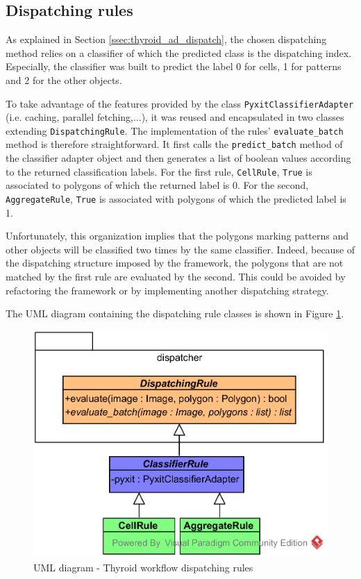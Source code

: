 \subsection{Dispatching rules}

As explained in Section \ref{ssec:thyroid_ad_dispatch}, the chosen dispatching method relies on a classifier of which the predicted class is the dispatching index. Especially, the classifier was built to predict the label 0 for cells, 1 for patterns and 2 for the other objects.

To take advantage of the features provided by the class \texttt{PyxitClassifierAdapter} (i.e. caching, parallel fetching,...), it was reused and encapsulated in two classes extending \texttt{DispatchingRule}. The implementation of the rules' \texttt{evaluate\_batch} method is therefore straightforward. It first calls the \texttt{predict\_batch} method of the classifier adapter object and then generates a list of boolean values according to the returned classification labels. For the first rule, \texttt{CellRule}, \texttt{True} is associated to polygons of which the returned label is 0. For the second, \texttt{AggregateRule}, \texttt{True} is associated with polygons of which the predicted label is 1.

Unfortunately, this organization implies that the polygons marking patterns and other objects will be classified two times by the same classifier. Indeed, because of the dispatching structure imposed by the framework, the polygons that are not matched by the first rule are evaluated by the second. This could be avoided by refactoring the framework or by implementing another dispatching strategy.

The UML diagram containing the dispatching rule classes is shown in Figure \ref{fig:uml_cyto_disp_rules}.

\begin{figure}
	\center
	\includegraphics[scale=0.85]{image/thyroid_dispatching_rules.png}
	\caption{UML diagram - Thyroid workflow dispatching rules}
	\label{fig:uml_cyto_disp_rules}
\end{figure}

